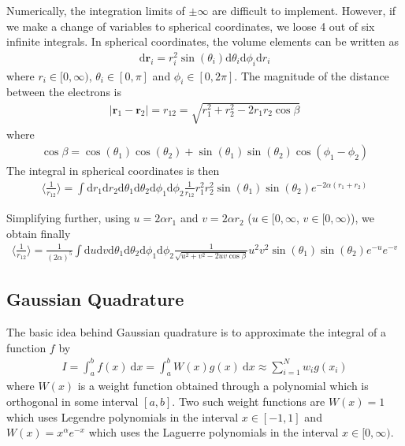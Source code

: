 \documentclass[twoside, 11pt]{article}
\renewcommand{\d}{\mathrm{d}}
\begin{document}
		Numerically, the integration limits of $\pm \infty$ are difficult to implement. However, if we make a change of variables to spherical coordinates, we loose 4 out of six infinite integrals.
		In spherical coordinates, the volume elements can be written as
		\begin{align}
			\d\mathbf{r}_i = r_i^2\sin (\theta_i)\d \theta_i \d \phi_i \d r_i
		\end{align}
		where $r_i \in [0, \infty)$, $\theta_i \in [0, \pi]$ and $\phi_i \in [0, 2\pi]$. The magnitude of the distance between the electrons is 
		\begin{align}
			|\mathbf{r}_1 - \mathbf{r}_2| = r_{12} = \sqrt{r_1^2 + r_2^2 - 2r_1 r_2 \cos \beta}
		\end{align}
		where
		\begin{align}
			\cos\beta = \cos(\theta_1) \cos (\theta_2) + \sin(\theta_1)\sin(\theta_2) \cos(\phi_1 - \phi_2) \nonumber
		\end{align}
		The integral in spherical coordinates is then
		\begin{align}
			\langle \frac{1}{r_{12}} \rangle = \int \d r_1 \d r_2 \d \theta_1 \d \theta_2 \d \phi_1 \d \phi_2 \frac{1}{r_{12}} r_1^2r_2^2\sin(\theta_1)\sin(\theta_2) e^{-2\alpha(r_1+r_2)}
		\end{align}
		
		Simplifying further, using $u = 2\alpha r_1$ and $v = 2\alpha r_2$ ($u\in [0,\infty$, $v\in [0, \infty)$), we obtain finally
		\begin{align}
			\langle \frac{1}{r_{12}} \rangle = \frac{1}{(2\alpha)^5} \int \d u \d v \d \theta_1 \d \theta_2 \d \phi_1 \d \phi_2 \frac{1}{\sqrt{u^2 + v^2 - 2uv\cos\beta}} u^2v^2\sin(\theta_1)\sin(\theta_2) e^{-u}e^{-v} \label{eq: integral in spherical coordinates, u, v}
		\end{align}
		
	\subsection{Gaussian Quadrature}
		The basic idea behind Gaussian quadrature is to approximate the integral of a function $f$ by
		\begin{align}
			I = \int_{a}^{b} f(x) \ \d x  = \int_{a}^{b} W(x)g(x) \ \d x \approx \sum_{i=1}^N w_i g(x_i) \label{eq: gaussian quadrature basic idea}
		\end{align}
		where $W(x)$ is a weight function obtained through a polynomial which is orthogonal in some interval $[a, b]$. Two such weight functions are $W(x)=1$ which uses Legendre polynomials in the interval $x\in[-1, 1]$ and $W(x) = x^\alpha e^{-x}$ which uses the Laguerre polynomials in the interval $x \in [0, \infty)$. 
		
\end{document}
